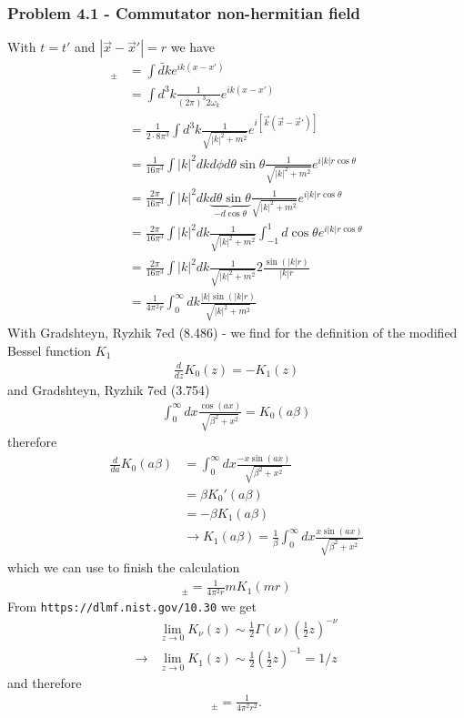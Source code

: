 \documentclass[10pt,a4paper]{book}
\theoremstyle{definition}
\begin{document}
\subsubsection{Problem 4.1 - Commutator non-hermitian field}
With $t=t'$ and $|\vec{x}-\vec{x}'|=r$ we have 
\begin{align}
[\varphi^+(x),\varphi^-(x')]_\pm
&=\int\widetilde{dk}e^{ik(x-x')}\\
&=\int d^3k\frac{1}{(2\pi)^3 2\omega_k}e^{ik(x-x')}\\
&=\frac{1}{2\cdot8\pi^3}\int d^3k\frac{1}{\sqrt{|k|^2+m^2}}e^{i[\vec{k}(\vec{x}-\vec{x}')]}\\
&=\frac{1}{16\pi^3}\int |k|^2dkd\phi d\theta\sin\theta\frac{1}{\sqrt{|k|^2+m^2}}e^{i|k|r\cos\theta}\\
&=\frac{2\pi}{16\pi^3}\int |k|^2dk \underbrace{d\theta\sin\theta}_{-d\cos\theta}\frac{1}{\sqrt{|k|^2+m^2}}e^{i|k|r\cos\theta}\\
&=\frac{2\pi}{16\pi^3}\int |k|^2dk \frac{1}{\sqrt{|k|^2+m^2}}\int_{-1}^1d\cos\theta e^{i|k|r\cos\theta}\\
&=\frac{2\pi}{16\pi^3}\int |k|^2dk \frac{1}{\sqrt{|k|^2+m^2}}2\frac{\sin(|k|r)}{|k|r}\\
&=\frac{1}{4\pi^2r}\int_0^\infty dk \frac{|k|\sin(|k|r)}{\sqrt{|k|^2+m^2}}
\end{align}
With Gradshteyn, Ryzhik 7ed (8.486) - we find for the definition of the modified Bessel function $K_1$ 
\begin{align}
\frac{d}{dz}K_0(z)=-K_1(z)
\end{align}
and Gradshteyn, Ryzhik 7ed (3.754)
\begin{align}
\int_0^\infty dx \frac{\cos(ax)}{\sqrt{\beta^2+x^2}}=K_0(a\beta)
\end{align}
therefore
\begin{align}
\frac{d}{da}K_0(a\beta)&=\int_0^\infty dx \frac{-x\sin(ax)}{\sqrt{\beta^2+x^2}}\\
&=\beta K_0'(a\beta)\\
&=-\beta K_1(a\beta)\\
&\rightarrow K_1(a\beta)=\frac{1}{\beta}\int_0^\infty dx \frac{x\sin(ax)}{\sqrt{\beta^2+x^2}}
\end{align}
which we can use to finish the calculation
\begin{align}
[\varphi^+(x),\varphi^-(x')]_\pm=\frac{1}{4\pi^2r}mK_1(mr)
\end{align}
From \texttt{https://dlmf.nist.gov/10.30} we get
\begin{align}
&\lim_{z\rightarrow0}K_\nu(z)\sim\frac{1}{2}\Gamma(\nu)\left(\frac{1}{2}z\right)^{-\nu}\\
\rightarrow&\lim_{z\rightarrow0}K_1(z)\sim\frac{1}{2}\left(\frac{1}{2}z\right)^{-1}=1/z
\end{align}
and therefore
\begin{align}
[\varphi^+(x),\varphi^-(x')]_\pm=\frac{1}{4\pi^2r^2}.
\end{align}
\end{document}
